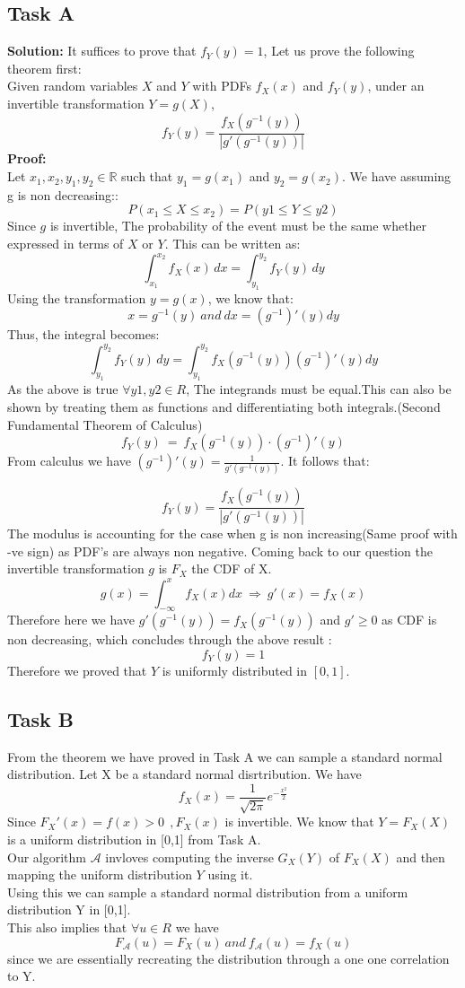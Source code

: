 \documentclass[12pt]{article}
\begin{document}
\subsection{Task A}
\textbf{Solution: } \newline
It suffices to prove that $f_{Y}(y)=1$,
Let us prove the following theorem first: \\
Given random variables $X$ and $Y$ with PDFs $f_X(x)$ and $f_Y(y)$, under an invertible transformation $Y = g(X)$, 
\[
f_Y(y) = \frac{f_X(g^{-1}(y))}{\left| g'(g^{-1}(y)) \right|}
\]
\textbf{Proof:} \\
Let $x_1, x_2, y_1, y_2 \in \mathbb{R}$ such that $y_1 = g(x_1)$ and $y_2 = g(x_2)$.
We have assuming g is non decreasing::
\[
P(x_1 \leq X \leq x_2) = P(y1 \leq Y \leq y2)
\]
Since $g$ is invertible,
The probability of the event must be the same whether expressed in terms of $X$ or $Y$. This can be written as:
\[
\int_{x_1}^{x_2} f_X(x) \, dx = \int_{y_1}^{y_2} f_Y(y) \, dy
\]
Using the transformation $y = g(x)$, we know that:
\[
x=g^{-1}(y)\ and\ dx=(g^{-1})'(y)dy
\]
Thus, the integral becomes:
\[
\int_{y_1}^{y_2} f_Y(y) \, dy = \int_{y_1}^{y_2} f_X(g^{-1}(y))(g^{-1})'(y)dy
\]
As the above is true $\forall y1,y2 \in R$, The integrands must be equal.This can also be shown by treating them as functions and differentiating both integrals.(Second Fundamental Theorem of Calculus)
\[
f_Y(y) \ =\ f_X(g^{-1}(y)) \cdot (g^{-1})'(y)
\]
From calculus we have $(g^{-1})'(y)=\frac{1}{g'(g^{-1}(y))}$. It follows that:

\[
\boxed{f_Y(y) = \frac{f_X(g^{-1}(y))}{\left| g'(g^{-1}(y)) \right|}}
\]
The modulus is accounting for the case when g is non increasing(Same proof with -ve sign) as PDF's are always non negative.
Coming back to our question the invertible transformation $g$ is $F_{X}$ the CDF of X.
\[g(x)=\int_{-\infty}^{x}f_{X}(x)dx\  \Rightarrow\ g'(x)=f_{X}(x) \] 
Therefore here we have $g'(g^{-1}(y))=f_{X}(g^{-1}(y))$ and $g'\ge 0$ as CDF is non decreasing, which concludes through the above result :
\[f_{Y}(y)=1\]
Therefore we proved that $Y$ is uniformly distributed in $[0,1]$.

\subsection{Task B}
From the theorem we have proved in Task A we can sample a standard normal distribution.
Let X be a standard normal disrtribution. We have
\[f_X(x) = \frac{1}{\sqrt{2\pi}} e^{-\frac{x^2}{2}}\]
Since $F_{X}'(x)=f(x) > 0\ \ ,F_{X}(x)$ is invertible.
We know that $Y=F_{X}(X)$ is a uniform distribution in [0,1] from Task A.\\
Our algorithm $\mathcal{A}$ invloves computing the inverse $G_{X}(Y)$ of $F_{X}(X)$ and then mapping the uniform distribution $Y$ using it.\\
Using this we can sample a standard normal distribution from a uniform distribution Y in [0,1].\\
This also implies that $\forall u \in R$ we have 
\[F_{\mathcal{A}}(u)=F_{X}(u)\ and\ f_{\mathcal{A}}(u)=f_{X}(u)\]
since we are essentially recreating the distribution through a one one correlation to Y.
\end{document}

